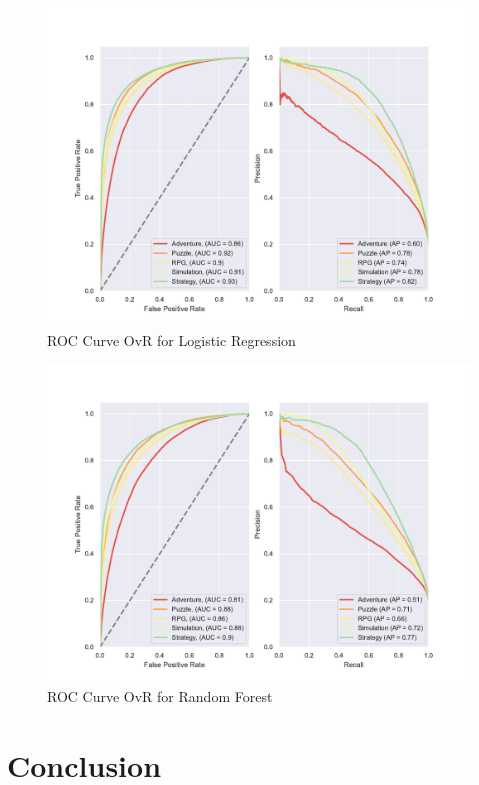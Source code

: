 \documentclass[11pt, a4paper]{article}
\begin{document}
\begin{figure}
    \centering
    \includegraphics[width=\textwidth]{data/results/plots/logistic_regression_roc}
    \caption{ROC Curve OvR for Logistic Regression}
    \label{fig:lr_roc_fig}
\end{figure}


\begin{figure}
    \centering
    \includegraphics[width=\textwidth]{data/results/plots/random_forest_roc}
    \caption{ROC Curve OvR for Random Forest}
    \label{fig:rf_roc_fig}
\end{figure}



\section{Conclusion}\label{sec:conclusion}
\end{document}

